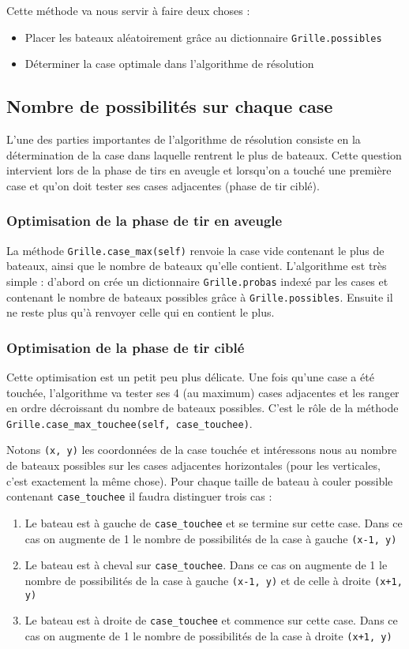 Cette méthode va nous servir à faire deux choses :
\begin{itemize}
\item Placer les bateaux aléatoirement grâce au dictionnaire \texttt{Grille.possibles}
\item Déterminer la case optimale dans l'algorithme de résolution
\end{itemize}

\subsection{Nombre de possibilités sur chaque case}
L'une des parties importantes de l'algorithme de résolution consiste en la détermination de la case dans laquelle rentrent le plus de bateaux. Cette question intervient lors de la phase de tirs en aveugle et lorsqu'on a touché une première case et qu'on doit tester ses cases adjacentes (phase de tir ciblé).
\subsubsection{Optimisation de la phase de tir en aveugle}\label{opti_aveugle}
La méthode \texttt{Grille.case\_max(self)} renvoie la case vide contenant le plus de bateaux, ainsi que le nombre de bateaux qu'elle contient. L'algorithme est très simple : d'abord on crée un dictionnaire \texttt{Grille.probas} indexé par les cases et contenant le nombre de bateaux possibles grâce à \texttt{Grille.possibles}. Ensuite il ne reste plus qu'à renvoyer celle qui en contient le plus.

\subsubsection{Optimisation de la phase de tir ciblé}\label{opti_touche}
Cette optimisation est un petit peu plus délicate. Une fois qu'une case a été touchée, l'algorithme va tester ses 4 (au maximum) cases adjacentes et les ranger en ordre décroissant du nombre de bateaux possibles. C'est le rôle de la méthode \texttt{Grille.case\_max\_touchee(self, case\_touchee)}. 

Notons \texttt{(x, y)} les coordonnées de la case touchée et intéressons nous au nombre de bateaux possibles sur les cases adjacentes horizontales (pour les verticales, c'est exactement la même chose). Pour chaque taille de bateau à couler possible contenant \texttt{case\_touchee} il faudra distinguer trois cas :
\begin{enumerate}
\item Le bateau est à gauche de \texttt{case\_touchee} et se termine sur cette case. Dans ce cas on augmente de 1 le nombre de possibilités de la case à gauche \texttt{(x-1, y)}
\item Le bateau est à cheval sur \texttt{case\_touchee}. Dans ce cas on augmente de 1 le nombre de possibilités de la case à gauche \texttt{(x-1, y)} et de celle à droite \texttt{(x+1, y)}
\item Le bateau est à droite de \texttt{case\_touchee} et commence sur cette case. Dans ce cas on augmente de 1 le nombre de possibilités de la case à droite \texttt{(x+1, y)}
\end{enumerate}


